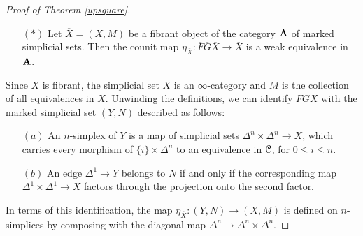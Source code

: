 \begin{proof}[Proof of Theorem \ref{upsquare}]
\begin{itemize}
\item[$(\ast)$] Let $\overline{X} = (X,M)$ be a fibrant object of the category ${\mathbf A}$ of marked simplicial sets. Then the counit map $\eta_{\overline{X}}: \overline{F} \overline{G} \overline{X} \rightarrow \overline{X}$ is a weak equivalence in ${\mathbf A}$.
\end{itemize}
Since $\overline{X}$ is fibrant, the simplicial set $X$ is an $\infty$-category and $M$ is the collection of all equivalences in $X$. Unwinding the definitions, we can identify
$\overline{F} \overline{G} X$ with the marked simplicial set $(Y, N)$ described as follows:
\begin{itemize}
\item[$(a)$] An $n$-simplex of $Y$ is a map of simplicial sets
$\Delta^n \times \Delta^n \rightarrow X$, which carries every morphism of
$\{i\} \times \Delta^n$ to an equivalence in $\operatorname{\mathcal{C}}$, for $0 \leq i \leq n$.
\item[$(b)$] An edge $\Delta^1 \rightarrow Y$ belongs to $N$ if and only if the corresponding
map $\Delta^1 \times \Delta^1 \rightarrow X$ factors through the projection onto the second
factor.
\end{itemize}

In terms of this identification, the map $\eta_{\overline{X}}: (Y,N) \rightarrow (X,M)$ is defined on $n$-simplices by composing with the diagonal map $\Delta^n \rightarrow \Delta^n \times \Delta^n$.


\end{proof}
